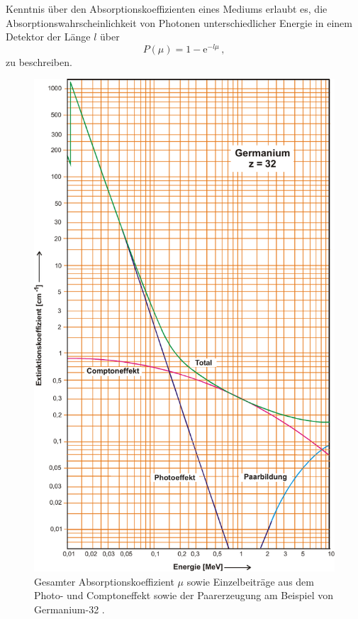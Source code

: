 Kenntnis über den Absorptionskoeffizienten eines Mediums erlaubt es, 
die Absorptionswahrscheinlichkeit von Photonen unterschiedlicher Energie in einem Detektor der Länge $l$ über
\begin{equation}
    P(\mu) = 1 - \text{e}^{-l \mu} \,,
    \label{eq:Absorptionswahrscheinlichkeit}
\end{equation}
zu beschreiben.

\begin{figure}[H]
    \centering
    \includegraphics{figures/extinction_coefficient.pdf}
    \caption{Gesamter Absorptionskoeffizient $\mu$ sowie Einzelbeiträge aus dem Photo- und Comptoneffekt sowie der Paarerzeugung am Beispiel von Germanium-32 \cite{ap704}.} 
    \label{fig:Absorptionskoeffizient}   
\end{figure}

